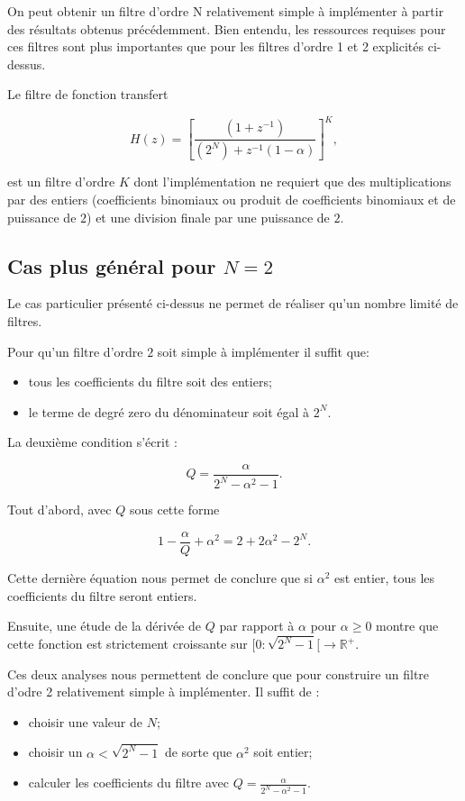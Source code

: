\documentclass{article}
\begin{document}
On peut obtenir un filtre d'ordre N relativement simple à implémenter à partir des résultats obtenus précédemment. Bien entendu, les ressources requises pour ces filtres sont plus importantes que pour les filtres d'ordre 1 et 2 explicités ci-dessus.

Le filtre de fonction transfert 

\begin{equation}
H(z) = \left[ \frac{(1+z^{-1})}{(2^{N})+z^{-1}(1-\alpha)} \right]^K, 
\end{equation}

est un filtre d'ordre $K$ dont l'implémentation ne requiert que des multiplications par des entiers (coefficients binomiaux ou produit de coefficients binomiaux et de puissance de $2$) et une division finale par une puissance de $2$.

\subsection{Cas plus général pour $N=2$}

Le cas particulier présenté ci-dessus ne permet de réaliser qu'un nombre limité de filtres.

Pour qu'un filtre d'ordre $2$ soit simple à implémenter il suffit que:

\begin{itemize}
\item tous les coefficients du filtre soit des entiers;
\item le terme de degré zero du dénominateur soit égal à $2^N$.
\end{itemize}

La deuxième condition s'écrit :

\begin{equation}
Q = \frac{\alpha}{2^N - \alpha^2-1}.
\end{equation}

Tout d'abord, avec $Q$ sous cette forme

\begin{equation}
1-\frac{\alpha}{Q}+\alpha^2=2+2\alpha^2-2^N.
\end{equation}

Cette dernière équation nous permet de conclure que si $\alpha^2$ est entier, tous les coefficients du filtre seront entiers. 

Ensuite, une étude de la dérivée de $Q$ par rapport à $\alpha$ pour $\alpha\geq 0$ montre que cette fonction est strictement croissante sur $[0:\sqrt{2^N-1}[ \rightarrow  \mathbb{R}^+$.

Ces deux analyses nous permettent de conclure que pour construire un filtre d'odre 2 relativement simple à implémenter. Il suffit de :
\begin{itemize}
\item choisir une valeur de $N$;
\item choisir un $\alpha<\sqrt{2^N-1}$ de sorte que $\alpha^2$ soit entier;
\item calculer les coefficients du filtre avec $Q = \frac{\alpha}{2^N - \alpha^2-1}$.
\end{itemize}
\end{document}
